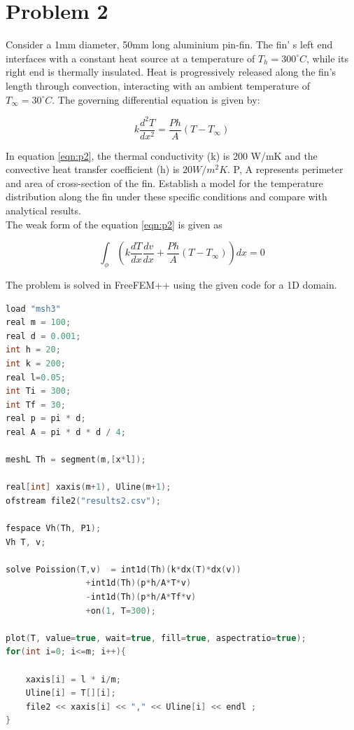 \documentclass[11pt]{article} %
\begin{document}
\section{Problem 2}
Consider a 1mm diameter, 50mm long aluminium pin-fin. The fin' s left end interfaces with a constant heat source at a temperature of $ T_{h} = 300^\circ C$, while its right end is thermally insulated. Heat is progressively released along the fin’s length through convection, interacting with an ambient temperature of $ T_{\infty} = 30^\circ C$. The governing differential equation is given by:

\begin{equation}\label{eqn:p2}
k\frac{d^2 T}{dx^2} = \frac{P h}{A}(T - T_{\infty}) 
\end{equation}

In equation \ref{eqn:p2}, the thermal conductivity (k) is 200 W/mK and the convective heat transfer coefficient (h) is $20W/m^2 K$. P, A represents perimeter and area of cross-section of the fin. Establish a model for the temperature distribution along the fin under these specific conditions and compare with analytical results.\\

The weak form of the equation \ref{eqn:p2} is given as 

\begin{equation}
\int_{\phi} \left( k \frac{dT}{dx} \frac{dv}{dx} + \frac{P h}{A}(T - T_{\infty}) \right) dx = 0
\end{equation}

\newpage
The problem is solved in FreeFEM++ using the given code for a 1D domain.
\begin{lstlisting}[language=C++, caption=Problem 2 Code ]
load "msh3"
real m = 100; 
real d = 0.001;
int h = 20;
int k = 200;
real l=0.05; 
int Ti = 300;
int Tf = 30;
real p = pi * d;
real A = pi * d * d / 4;

meshL Th = segment(m,[x*l]);

real[int] xaxis(m+1), Uline(m+1);
ofstream file2("results2.csv");

fespace Vh(Th, P1);
Vh T, v;

solve Poission(T,v)  = int1d(Th)(k*dx(T)*dx(v))
				+int1d(Th)(p*h/A*T*v)
				-int1d(Th)(p*h/A*Tf*v)
				+on(1, T=300);

plot(T, value=true, wait=true, fill=true, aspectratio=true);
for(int i=0; i<=m; i++){
	
	xaxis[i] = l * i/m;
	Uline[i] = T[][i];
	file2 << xaxis[i] << "," << Uline[i] << endl ;
}
\end{lstlisting}
\end{document}
